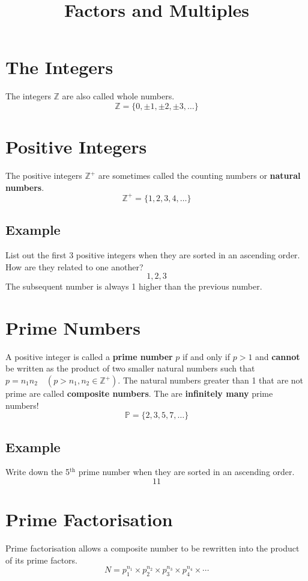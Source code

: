\documentclass[a4paper,12pt]{article}
\title{Factors and Multiples}
\date{}
\begin{document}
\maketitle
\section{The Integers}
The integers \(\mathbb Z\) are also called whole numbers.
\[\mathbb Z=\{0,\pm1,\pm2,\pm3,\dots\}\]

\section{Positive Integers}
The positive integers \(\mathbb Z^+\) are sometimes called the counting numbers or {\bf natural numbers}.
\[\mathbb Z^+=\{1,2,3,4,\dots\}\]
\subsection{Example}
List out the first 3 positive integers when they are sorted in an ascending order. How are they related to one another?
\[\boxed{1,2,3}\]
The subsequent number is always 1 higher than the previous number.

\section{Prime Numbers}
A positive integer is called a {\bf prime number} \(p\) if and only if \(p>1\) and {\bf cannot} be written as the product of two smaller natural numbers such that \(p=n_1n_2\quad (p>n_1,n_2\in\mathbb Z^+)\). The natural numbers greater than 1 that are not prime are called {\bf composite numbers}. The are {\bf infinitely many} prime numbers!
\[\mathbb P=\{2,3,5,7,\dots\}\]
\subsection{Example}
Write down the 5\(^{\text{th}}\) prime number when they are sorted in an ascending order.
\[\boxed{11}\]

\section{Prime Factorisation}
Prime factorisation allows a composite number to be rewritten into the product of its prime factors.
\[N=p_1^{n_1}\times p_2^{n_2}\times p_3^{n_3}\times p_4^{n_4}\times\cdots\]
\end{document}
